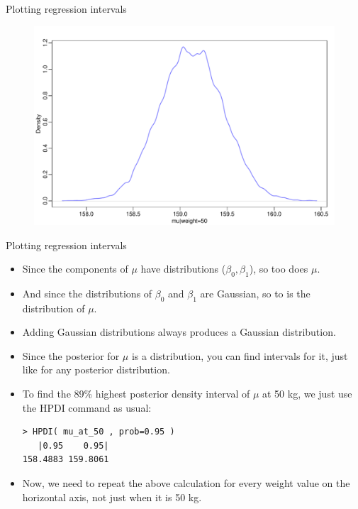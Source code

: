 \documentclass[handout]{beamer}
\begin{document}
\begin{frame}{Plotting regression intervals}

\begin{figure}[h!]
	\centering
	\includegraphics[scale=0.45]{pics/mu50.pdf}
\end{figure}

\end{frame}


\begin{frame}[fragile]{Plotting regression intervals}
\scriptsize{
\begin{itemize}
\item Since the components of $\mu$ have distributions ($\beta_0,\beta_1$), so too does $\mu$.

\item And since the distributions of $\beta_0$ and $\beta_1$ are Gaussian, so to is the distribution of $\mu$.

\item Adding Gaussian distributions always produces a Gaussian distribution.

\item Since the posterior for $\mu$ is a distribution, you can find intervals for it, just like for any posterior distribution. 

\item To find the 89\% highest posterior density interval of $\mu$ at 50 kg, we just use the HPDI command as usual:

\begin{verbatim}
> HPDI( mu_at_50 , prob=0.95 )
   |0.95    0.95| 
158.4883 159.8061  
\end{verbatim}

\item Now, we need to repeat the above calculation for every weight value on the horizontal axis, not just when it is 50 kg.

\end{itemize}
 

 
}
\end{frame}
\end{document}
